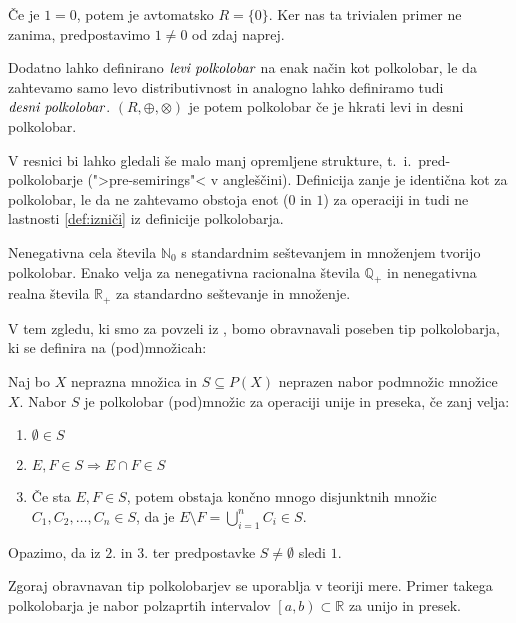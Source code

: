 \documentclass[mat1]{fmfdelo}
\newcommand{\R}{\mathbb{R}}
\newcommand{\N}{\mathbb{N}}
\newcommand{\No}{\N_0}
\newcommand{\Pplus}[1]{\mathbb{#1}_{+}}
\newcommand{\pojem}[1]{\ensuremath{\emph{#1}}}
\begin{document}
\begin{opomba}
	Če je $1 = 0$, potem je avtomatsko $R = \{0\}$. Ker nas ta trivialen primer ne zanima, predpostavimo $1 \neq 0$ od zdaj naprej.
\end{opomba}

\begin{opomba}
	Dodatno lahko definirano \pojem{levi polkolobar} na enak način kot polkolobar, le da zahtevamo samo levo distributivnost in analogno lahko definiramo tudi \pojem{desni polkolobar}. $(R,\oplus, \otimes)$ je potem polkolobar če je hkrati levi in desni polkolobar.
\end{opomba}
\begin{opomba}
	V resnici bi lahko gledali še malo manj opremljene strukture, t.~i.~pred-polkolobarje (">pre-semirings"< v angleščini). Definicija zanje je identična kot za polkolobar, le da ne zahtevamo obstoja enot ($0$ in $1$) za operaciji in tudi ne lastnosti \ref{def:izniči} iz definicije polkolobarja.
\end{opomba}
\begin{zgled}
	Nenegativna cela števila $\No$ s standardnim seštevanjem in množenjem tvorijo polkolobar. Enako velja za nenegativna racionalna števila $\Pplus{Q}$ in nenegativna realna števila $\Pplus{R}$ za standardno seštevanje in množenje.
\end{zgled}
V tem zgledu, ki smo za povzeli iz \cite{bib:Wiki}, bomo obravnavali poseben tip polkolobarja, ki se definira na (pod)množicah:
\begin{zgled}
	Naj bo $X$ neprazna množica in $S \subseteq P(X)$ neprazen nabor podmnožic množice $X$. Nabor $S$ je polkolobar (pod)množic za operaciji unije in preseka, če zanj velja:
	\begin{enumerate}
		\item $\emptyset\in S$
		\item $E, F\in S \Rightarrow E\cap F \in S$
		\item Če sta $E, F \in S$, potem obstaja končno mnogo disjunktnih množic \\ $C_{1}, C_{2}, \ldots, C_{n} \in S$, da je $E\setminus F = \bigcup_{i = 1}^{n}C_i \in S$.
	\end{enumerate}

	Opazimo, da iz $2.$ in $3.$ ter predpostavke $S\neq\emptyset$ sledi $1.$ 
\end{zgled}

Zgoraj obravnavan tip polkolobarjev se uporablja v teoriji mere. Primer takega polkolobarja je nabor polzaprtih intervalov $\left[a, b\right) \subset \R$ za unijo in presek.
\end{document}
